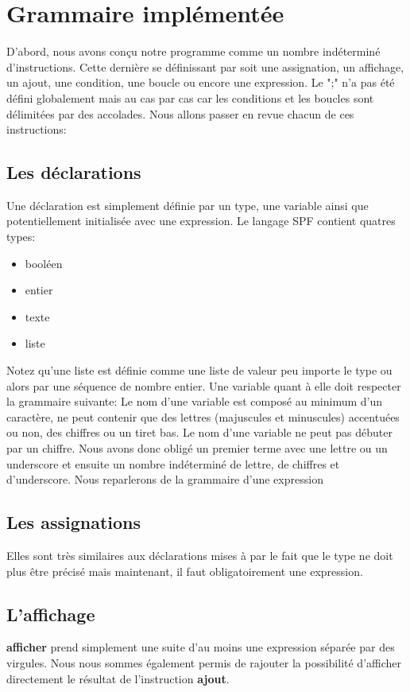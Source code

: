 \section{Grammaire implémentée}
D'abord, nous avons conçu notre programme comme un nombre indéterminé d'instructions.
Cette dernière se définissant par soit une assignation, un affichage, un ajout, une condition, une boucle ou encore une expression.
Le ";" n'a pas été défini globalement mais au cas par cas car les conditions et les boucles sont délimitées par des accolades.
Nous allons passer en revue chacun de ces instructions:

\subsection{Les déclarations}
Une déclaration est simplement définie par un type, une variable ainsi que potentiellement initialisée avec une expression.
Le langage SPF contient quatres types:

\begin{itemize}
\item booléen
\item entier
\item texte
\item liste
\end{itemize}

Notez qu'une liste est définie comme une liste de valeur peu importe le type ou alors par une séquence de nombre entier.
Une variable quant à elle doit respecter la grammaire suivante:
Le nom d’une variable est composé au minimum d’un caractère, ne peut contenir que des lettres (majuscules et minuscules) accentuées ou non, des chiffres ou un tiret bas. Le nom d’une variable ne peut pas débuter par un chiffre.
Nous avons donc obligé un premier terme avec une lettre ou un underscore et ensuite un nombre indéterminé de lettre, de chiffres et d'underscore.
Nous reparlerons de la grammaire d'une expression

\subsection{Les assignations}
Elles sont très similaires aux déclarations mises à par le fait que le type ne doit plus être précisé mais maintenant, il faut obligatoirement une expression.

\subsection{L'affichage}
\textbf{afficher} prend simplement une suite d'au moins une expression séparée par des virgules.
Nous nous sommes également permis de rajouter la possibilité d'afficher directement le résultat de l'instruction \textbf{ajout}.

